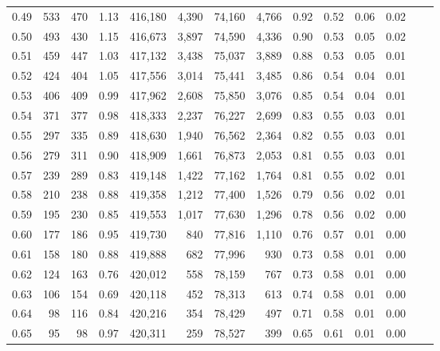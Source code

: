 \begin{tabular}{rrrrrrrrrrrrrr}
0.49 &     533 &    470 &    1.13 &  416,180 &    4,390 &  74,160 &   4,766 &  0.92 &  0.52 &  0.06 &      0.02 \\
0.50 &     493 &    430 &    1.15 &  416,673 &    3,897 &  74,590 &   4,336 &  0.90 &  0.53 &  0.05 &      0.02 \\
0.51 &     459 &    447 &    1.03 &  417,132 &    3,438 &  75,037 &   3,889 &  0.88 &  0.53 &  0.05 &      0.01 \\
0.52 &     424 &    404 &    1.05 &  417,556 &    3,014 &  75,441 &   3,485 &  0.86 &  0.54 &  0.04 &      0.01 \\
0.53 &     406 &    409 &    0.99 &  417,962 &    2,608 &  75,850 &   3,076 &  0.85 &  0.54 &  0.04 &      0.01 \\
0.54 &     371 &    377 &    0.98 &  418,333 &    2,237 &  76,227 &   2,699 &  0.83 &  0.55 &  0.03 &      0.01 \\
0.55 &     297 &    335 &    0.89 &  418,630 &    1,940 &  76,562 &   2,364 &  0.82 &  0.55 &  0.03 &      0.01 \\
0.56 &     279 &    311 &    0.90 &  418,909 &    1,661 &  76,873 &   2,053 &  0.81 &  0.55 &  0.03 &      0.01 \\
0.57 &     239 &    289 &    0.83 &  419,148 &    1,422 &  77,162 &   1,764 &  0.81 &  0.55 &  0.02 &      0.01 \\
0.58 &     210 &    238 &    0.88 &  419,358 &    1,212 &  77,400 &   1,526 &  0.79 &  0.56 &  0.02 &      0.01 \\
0.59 &     195 &    230 &    0.85 &  419,553 &    1,017 &  77,630 &   1,296 &  0.78 &  0.56 &  0.02 &      0.00 \\
0.60 &     177 &    186 &    0.95 &  419,730 &      840 &  77,816 &   1,110 &  0.76 &  0.57 &  0.01 &      0.00 \\
0.61 &     158 &    180 &    0.88 &  419,888 &      682 &  77,996 &     930 &  0.73 &  0.58 &  0.01 &      0.00 \\
0.62 &     124 &    163 &    0.76 &  420,012 &      558 &  78,159 &     767 &  0.73 &  0.58 &  0.01 &      0.00 \\
0.63 &     106 &    154 &    0.69 &  420,118 &      452 &  78,313 &     613 &  0.74 &  0.58 &  0.01 &      0.00 \\
0.64 &      98 &    116 &    0.84 &  420,216 &      354 &  78,429 &     497 &  0.71 &  0.58 &  0.01 &      0.00 \\
0.65 &      95 &     98 &    0.97 &  420,311 &      259 &  78,527 &     399 &  0.65 &  0.61 &  0.01 &      0.00 \\

\end{tabular}
